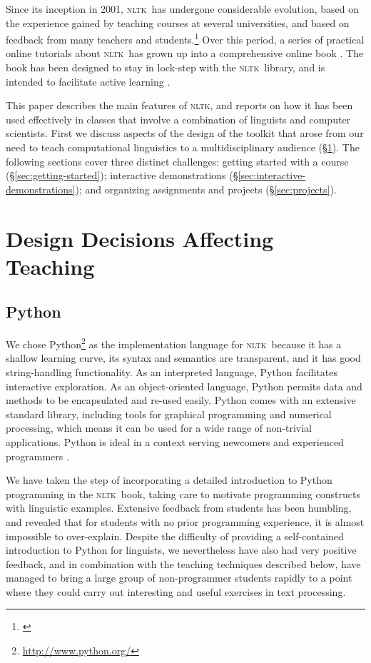 \documentclass[11pt]{article}
\newcommand{\NLTK}{\textsc{nltk}}
\begin{document}
Since its inception in 2001, \NLTK\ has undergone considerable
evolution, based on the experience gained by teaching courses at
several universities, and based on feedback from many teachers and
students.\footnote{\cite{BirdLoper04,Loper04,Bird05icon,Hearst05,Bird06nltk,Klein06altw,Liddy05,Madnani07,Madnani08}}
Over this period, a series of practical online tutorials
about \NLTK\ has grown up into a comprehensive online book \cite{BirdKleinLoper08}.
The book has been designed to stay in lock-step
with the \NLTK\ library, and is intended to facilitate
active learning \cite{BonwellEison91}.

This paper describes the main features of \NLTK, and reports on how it has
been used effectively in classes that involve a combination of
linguists and computer scientists.  First we discuss aspects of the
design of the toolkit that arose from our need to teach computational
linguistics to a multidisciplinary audience (\S\ref{sec:design}).
The following sections cover three distinct challenges:
getting started with a course (\S\ref{sec:getting-started});
interactive demonstrations (\S\ref{sec:interactive-demonstrations});
and organizing assignments and projects (\S\ref{sec:projects}).

\section{Design Decisions Affecting Teaching}
\label{sec:design}

\subsection{Python}

We chose Python\footnote{\url{http://www.python.org/}} as the
implementation language for \NLTK\ because it has a shallow learning
curve, its syntax and semantics are transparent, and it has good
string-handling functionality.  As an interpreted language, Python
facilitates interactive exploration.  As an object-oriented language,
Python permits data and methods to be encapsulated and re-used easily.
Python comes with an extensive standard library, including tools for
graphical programming and numerical processing, which means it can be
used for a wide range of non-trivial applications.  Python is ideal in
a context serving newcomers and experienced programmers
\cite{Shannon03}.

We have taken the step of incorporating a detailed introduction to
Python programming in the \NLTK\ book, taking care to motivate
programming constructs with linguistic examples. Extensive feedback
from students has been humbling, and revealed that for students with
no prior programming experience, it is almost impossible to
over-explain. Despite the difficulty of providing a
self-contained introduction to Python for linguists, we nevertheless
have also had very positive feedback, and in combination with the
teaching techniques described below, have managed to bring a
large group of non-programmer students rapidly to a point where they
could carry out interesting and useful exercises in text processing.
\end{document}

